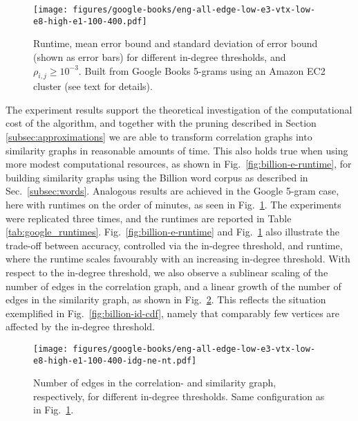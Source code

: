 \documentclass{sig-alternate}
\newcommand{\rn}[1]{\rho_{#1}}
\begin{document}
\begin{figure}
\begin{centering}
\texttt{[image: figures/google-books/eng-all-edge-low-e3-vtx-low-e8-high-e1-100-400.pdf]}
\end{centering}
\caption{Runtime, mean error bound and standard deviation of error bound (shown as error bars) for different in-degree thresholds, and $\rn{i,j} \geq 10^{-3}$. Built from Google Books 5-grams using an Amazon
EC2 cluster (see text for details).}
\label{fig:google-e-runtime}
\end{figure}

The experiment results support the theoretical investigation of the computational
cost of the algorithm, and together with the pruning
described in Section \ref{subsec:approximations} we are able to transform correlation graphs into similarity
graphs in reasonable amounts of time. This also holds true when using more modest computational resources,
as shown in Fig.\ \ref{fig:billion-e-runtime}, for building similarity graphs using the Billion word corpus as described
in Sec.\ \ref{subsec:words}. Analogous results are achieved in the Google 5-gram case, here with runtimes on the order of minutes,
as seen in Fig.\ \ref{fig:google-e-runtime}. The experiments were replicated three times, and
the runtimes are reported in Table \ref{tab:google_runtimes}.
Fig.\ \ref{fig:billion-e-runtime} and Fig.\ \ref{fig:google-e-runtime} also illustrate the trade-off between accuracy, controlled
via the in-degree threshold, and runtime, where the runtime scales favourably with an increasing in-degree threshold.
With respect to the in-degree threshold, we also observe a sublinear scaling of the number of edges in the correlation
graph, and a linear growth of the number of  edges in the similarity graph,  as shown in Fig.\ \ref{fig:google-ne}. This reflects the
situation exemplified in Fig.\ \ref{fig:billion-id-cdf}, namely that comparably few vertices are affected by the in-degree threshold.

\begin{figure}
\begin{centering}
\texttt{[image: figures/google-books/eng-all-edge-low-e3-vtx-low-e8-high-e1-100-400-idg-ne-nt.pdf]}
\end{centering}
\caption{Number of edges in the correlation- and similarity graph, respectively, for different in-degree thresholds. Same configuration as in Fig.\ \ref{fig:google-e-runtime}.}
\label{fig:google-ne}
\end{figure}
\end{document}
